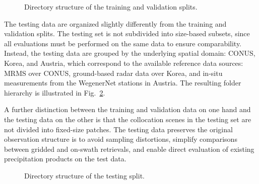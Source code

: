\documentclass[11pt]{article}
\begin{document}
\begin{figure}[hbpt!] %


	\caption{
		Directory structure of the training and validation splits.
	}
	\label{fig:train_val_organization}
\end{figure}

The testing data are organized slightly differently from the training and
validation splits. The testing set is not subdivided into size-based subsets,
since all evaluations must be performed on the same data to ensure
comparability. Instead, the testing data are grouped by the underlying spatial
domain: CONUS, Korea, and Austria, which correspond to the available reference
data sources: MRMS over CONUS, ground-based radar data over Korea, and in-situ
measurements from the WegenerNet stations in Austria. The resulting folder
hierarchy is illustrated in Fig.~\ref{fig:testing_organization}.

A further distinction between the training and validation data on one hand and
the testing data on the other is that the collocation scenes in the testing set
are not divided into fixed-size patches. The testing data preserves the original
observation structure is to avoid sampling distortions, simplify comparisons
between gridded and on-swath retrievals, and enable direct evaluation of
existing precipitation products on the test data.


\begin{figure}[hbpt!] %


	\caption{
		Directory structure of the testing split.
	}
	\label{fig:testing_organization}
\end{figure}
\end{document}
